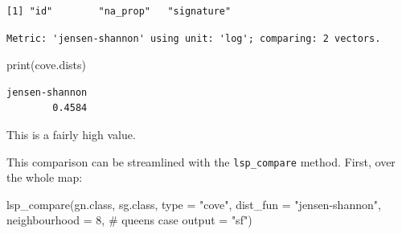 \documentclass[
  letterpaper,
  DIV=11,
  numbers=noendperiod]{scrartcl}
\newenvironment{Shaded}{\begin{snugshade}}{\end{snugshade}}
\newcommand{\AttributeTok}[1]{\textcolor[rgb]{0.40,0.45,0.13}{#1}}
\newcommand{\CommentTok}[1]{\textcolor[rgb]{0.37,0.37,0.37}{#1}}
\newcommand{\ConstantTok}[1]{\textcolor[rgb]{0.56,0.35,0.01}{#1}}
\newcommand{\DecValTok}[1]{\textcolor[rgb]{0.68,0.00,0.00}{#1}}
\newcommand{\FunctionTok}[1]{\textcolor[rgb]{0.28,0.35,0.67}{#1}}
\newcommand{\NormalTok}[1]{\textcolor[rgb]{0.00,0.23,0.31}{#1}}
\newcommand{\OtherTok}[1]{\textcolor[rgb]{0.00,0.23,0.31}{#1}}
\newcommand{\SpecialCharTok}[1]{\textcolor[rgb]{0.37,0.37,0.37}{#1}}
\newcommand{\StringTok}[1]{\textcolor[rgb]{0.13,0.47,0.30}{#1}}
\begin{document}
\begin{verbatim}
[1] "id"        "na_prop"   "signature"
\end{verbatim}

\begin{Shaded}
\end{Shaded}

\begin{verbatim}
Metric: 'jensen-shannon' using unit: 'log'; comparing: 2 vectors.
\end{verbatim}

\begin{Shaded}
\begin{Highlighting}[]
\FunctionTok{print}\NormalTok{(cove.dists)}
\end{Highlighting}
\end{Shaded}

\begin{verbatim}
jensen-shannon 
        0.4584 
\end{verbatim}

This is a fairly high value.

This comparison can be streamlined with the \texttt{lsp\_compare}
method. First, over the whole map:

\begin{Shaded}
\begin{Highlighting}[]
\FunctionTok{lsp\_compare}\NormalTok{(gn.class, sg.class, }
            \AttributeTok{type =} \StringTok{"cove"}\NormalTok{, }\AttributeTok{dist\_fun =} \StringTok{"jensen{-}shannon"}\NormalTok{,}
            \AttributeTok{neighbourhood =} \DecValTok{8}\NormalTok{, }\CommentTok{\# queen\textquotesingle{}s case}
            \AttributeTok{output =} \StringTok{"sf"}\NormalTok{)}
\end{Highlighting}
\end{Shaded}
\end{document}
